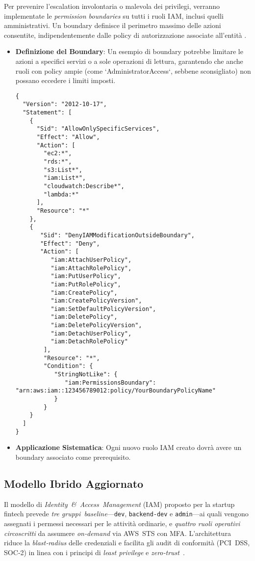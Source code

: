 Per prevenire l'escalation involontaria o malevola dei privilegi, verranno implementate le \emph{permission boundaries} su tutti i ruoli IAM, inclusi quelli amministrativi. Un boundary definisce il perimetro massimo delle azioni consentite, indipendentemente dalle policy di autorizzazione associate all'entità \cite{aws:iam:boundaries}.
\begin{itemize}
    \item \textbf{Definizione del Boundary}: Un esempio di boundary potrebbe limitare le azioni a specifici servizi o a sole operazioni di lettura, garantendo che anche ruoli con policy ampie (come `AdministratorAccess`, sebbene sconsigliato) non possano eccedere i limiti imposti.
    \begin{lstlisting}[style=json, caption={Esempio di Permission Boundary restrittiva}, label=lst:permission-boundary]
{
  "Version": "2012-10-17",
  "Statement": [
    {
      "Sid": "AllowOnlySpecificServices",
      "Effect": "Allow",
      "Action": [
        "ec2:*",
        "rds:*",
        "s3:List*",
        "iam:List*",
        "cloudwatch:Describe*",
        "lambda:*"
      ],
      "Resource": "*"
    },
    {
       "Sid": "DenyIAMModificationOutsideBoundary",
       "Effect": "Deny",
       "Action": [
          "iam:AttachUserPolicy",
          "iam:AttachRolePolicy",
          "iam:PutUserPolicy",
          "iam:PutRolePolicy",
          "iam:CreatePolicy",
          "iam:CreatePolicyVersion",
          "iam:SetDefaultPolicyVersion",
          "iam:DeletePolicy",
          "iam:DeletePolicyVersion",
          "iam:DetachUserPolicy",
          "iam:DetachRolePolicy"
        ],
        "Resource": "*",
        "Condition": {
           "StringNotLike": {
              "iam:PermissionsBoundary": "arn:aws:iam::123456789012:policy/YourBoundaryPolicyName"
           }
        }
    }
  ]
}
    \end{lstlisting}
    \item \textbf{Applicazione Sistematica}: Ogni nuovo ruolo IAM creato dovrà avere un boundary associato come prerequisito.
\end{itemize}

\subsection{Modello Ibrido Aggiornato}
\label{subsec:modello_ibrido_aggiornato}

Il modello di \emph{Identity \& Access Management} (IAM) proposto per la startup fintech prevede \emph{tre gruppi baseline}—\texttt{dev}, \texttt{backend‑dev} e \texttt{admin}—ai quali vengono
assegnati i permessi necessari per le attività ordinarie, e
\emph{quattro ruoli operativi circoscritti} da assumere \emph{on‑demand} via AWS STS con MFA.
L’architettura riduce la \emph{blast‑radius} delle credenziali
e facilita gli audit di conformità (PCI DSS, SOC‑2) in linea con i
principi di \emph{least privilege} e \emph{zero‑trust} \cite{NIST_ZTA,NIST_SP80063,PCI_DSS,DatadogLeastPrivilege}.

